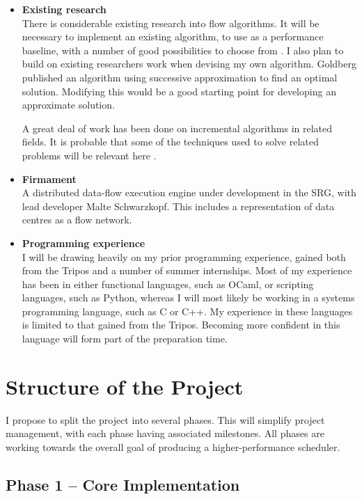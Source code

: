 \begin{itemize}
  \item \textbf{Existing research} \\
    There is considerable existing research into flow algorithms. It will be necessary to implement an existing algorithm, to use as a performance baseline, with a number of good possibilities to choose from \cite{Goldberg:1992,Zolt:2012}. I also plan to build on existing researchers work when devising my own algorithm. Goldberg \cite{Goldberg:1987} published an algorithm using successive approximation to find an optimal solution. Modifying this would be a good starting point for developing an approximate solution. 

    A great deal of work has been done on incremental algorithms in related fields. It is probable that some of the techniques used to solve related problems will be relevant here \cite{Ramalingam:1996,Roddity:2011}.
  \item \textbf{Firmament} \\
  A distributed data-flow execution engine under development in the SRG, with lead developer Malte Schwarzkopf. This includes a representation of data centres as a flow network.
  \item \textbf{Programming experience} \\ 
        I will be drawing heavily on my prior programming experience, gained both from the Tripos and a number of summer internships. Most of my experience has been in either functional languages, such as OCaml, or scripting languages, such as Python, whereas I will most likely be working in a systems programming language, such as C or C++. My experience in these languages is limited to that gained from the Tripos. Becoming more confident in this language will form part of the preparation time. 
\end{itemize}

\section*{Structure of the Project}

I propose to split the project into several phases. This will simplify project management, with each phase having associated milestones. All phases are working towards the overall goal of producing a higher-performance scheduler.

\subsection*{Phase 1 -- Core Implementation}
\label{subsec:structure-phase1}

